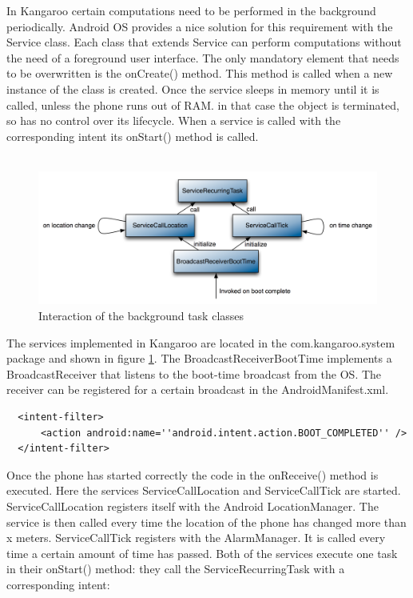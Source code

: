 In Kangaroo certain computations need to be performed in the background periodically.  Android OS provides a nice solution for this requirement with the Service class. Each class that extends Service can perform computations without the need of a foreground user interface. The only mandatory element that needs to be overwritten is the onCreate() method. This method is called when a new instance of the class is created. Once the service sleeps in memory until it is called, unless the phone runs out of RAM. in that case the object is terminated, so has no control over its lifecycle. When a service is called with the corresponding intent its onStart() method is called.\\\\
\begin{figure}[h!]
\centering
\includegraphics[width=14cm]{pics/background1.png}
\caption{Interaction of the background task classes}
\label{background1}
\end{figure}  
The services implemented in Kangaroo are located in the com.kangaroo.system package and shown in figure \ref{background1}. The BroadcastReceiverBootTime implements a BroadcastReceiver that listens to the boot-time broadcast from the OS. The receiver can be registered for a certain broadcast in the AndroidManifest.xml.
\begin{verbatim}  
  <intent-filter>	  
      <action android:name=''android.intent.action.BOOT_COMPLETED'' />
  </intent-filter>
\end{verbatim}
Once the phone has started correctly the code in the onReceive() method is executed. Here the services ServiceCallLocation and ServiceCallTick are started. ServiceCallLocation registers itself with the Android LocationManager. The service is then called every time the location of the phone has changed more than x meters. 
ServiceCallTick registers  with the AlarmManager. It is called every time a certain amount of time has passed.
Both of the services execute one task in their onStart() method: they call the ServiceRecurringTask with a corresponding intent:
